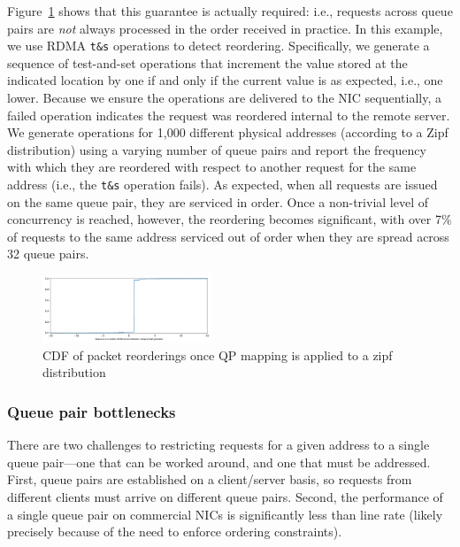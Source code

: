 Figure~\ref{fig:reorder} shows that this guarantee is actually required: i.e.,
requests across queue pairs are \emph{not} always processed in the order
received in practice.  In this example, we use RDMA \texttt{t\&s} operations to
detect reordering.  Specifically, we generate a sequence of test-and-set
operations that increment the value stored at the indicated location by one if
and only if the current value is as expected, i.e., one lower.  Because we
ensure the operations are delivered to the NIC sequentially, a failed operation
indicates the request was reordered internal to the remote server.  We generate
operations for 1,000 different physical addresses (according to a Zipf
distribution) using a varying number of queue pairs and report the frequency
with which they are reordered with respect to another request for the same
address (i.e., the \texttt{t\&s} operation fails).  As expected, when all
requests are issued on the same queue pair, they are serviced in order.  Once a
non-trivial level of concurrency is reached, however, the reordering becomes
significant, with over 7\% of requests to the same address serviced out of order
when they are spread across 32 queue pairs.

\begin{figure}[t]
    \includegraphics[width=0.45\textwidth]{fig/qp_reordering.pdf}
    \caption{CDF of packet reorderings once QP mapping is applied to a zipf distribution}
    \label{fig:reorder}
\end{figure}

\subsubsection{Queue pair bottlenecks}

 There are two challenges to restricting requests for a given address
 to a single queue pair---one that can be worked around, and one that
 must be addressed.  First, queue pairs are established on a
 client/server basis, so requests from different clients must arrive
 on different queue pairs.  Second, the performance of a single queue
 pair on commercial NICs is significantly less than line rate (likely
 precisely because of the need to enforce ordering constraints).

